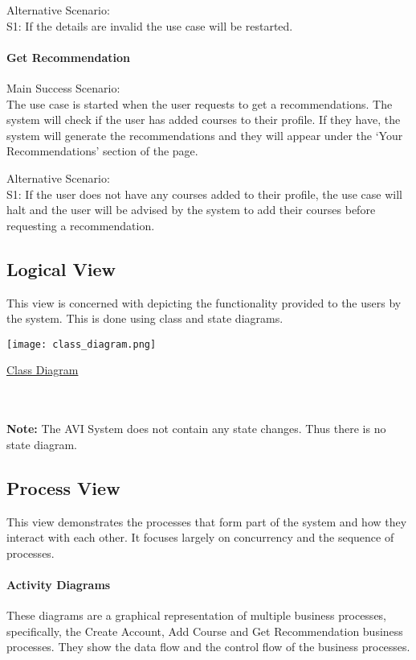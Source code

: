 \documentclass[10pt]{article}
\begin{document}
Alternative Scenario: \\
S1: If the details are invalid the use case will be restarted.

\paragraph{ Get Recommendation \\}

Main Success Scenario:\\
The use case is started when the user requests to get a recommendations. The system will check if the user has added courses to their profile. If they have, the system will generate the recommendations and they will appear under the ‘Your Recommendations’ section of the page.

Alternative Scenario:\\
S1: If the user does not have any courses added to their profile, the use case will halt and the user will be advised by the system to add their courses before requesting a recommendation.

\subsection{Logical View}

This view is concerned with depicting the functionality provided to the users by the system. This is done using class and state diagrams.
\begin{center}
\texttt{[image: class\_diagram.png]}
\end{center}
\caption{\underline{Class Diagram}} \\ \\

\textbf{Note:} The AVI System does not contain any state changes. Thus there is no state diagram. 

\subsection{Process View}

This view demonstrates the processes that form part of the system and how they interact with each other. It focuses largely on concurrency and the sequence of processes.


\paragraph{Activity Diagrams \\}
These diagrams are a graphical representation of multiple business processes, specifically, the Create Account, Add Course and Get Recommendation business processes. They show the data flow and the control flow of the business processes.
\end{document}

